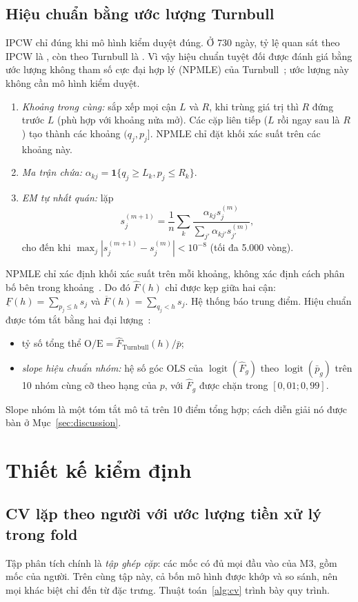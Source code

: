 \documentclass[journal]{IEEEtran}
\begin{document}
\subsection{Hiệu chuẩn bằng ước lượng Turnbull}
IPCW chỉ đúng khi mô hình kiểm duyệt đúng. Ở 730 ngày, tỷ lệ quan sát theo IPCW là , còn theo Turnbull là . Vì vậy hiệu chuẩn tuyệt đối được đánh giá bằng ước lượng không tham số cực đại hợp lý (NPMLE) của Turnbull~\cite{turnbull1976}; ước lượng này không cần mô hình kiểm duyệt.
\begin{enumerate}
\item \emph{Khoảng trong cùng:} sắp xếp mọi cận $L$ và $R$, khi trùng giá trị thì $R$ đứng trước $L$ (phù hợp với khoảng nửa mở). Các cặp liên tiếp ($L$ rồi ngay sau là $R$) tạo thành các khoảng $(q_j,p_j]$. NPMLE chỉ đặt khối xác suất trên các khoảng này.
\item \emph{Ma trận chứa:} $\alpha_{kj}=\bm 1\{q_j\ge L_k, p_j\le R_k\}$.
\item \emph{EM tự nhất quán:} lặp
\begin{equation}\label{eq:turnbull}
s_j^{(m+1)}=\frac1n\sum_k\frac{\alpha_{kj}s_j^{(m)}}{\sum_{j'}\alpha_{kj'}s_{j'}^{(m)}},
\end{equation}
cho đến khi $\max_j|s_j^{(m+1)}-s_j^{(m)}|<10^{-8}$ (tối đa 5.000 vòng).
\end{enumerate}
NPMLE chỉ xác định khối xác suất trên mỗi khoảng, không xác định cách phân bố bên trong khoảng~\cite{sun2006}. Do đó $\hat F(h)$ chỉ được kẹp giữa hai cận: $\underline F(h)=\sum_{p_j\le h}s_j$ và $\overline F(h)=\sum_{q_j<h}s_j$. Hệ thống báo trung điểm. Hiệu chuẩn được tóm tắt bằng hai đại lượng~\cite{vancalster2016}:
\begin{itemize}
\item tỷ số tổng thể $\mathrm{O/E}=\hat F_{\text{Turnbull}}(h)/\bar p$;
\item \emph{slope hiệu chuẩn nhóm:} hệ số góc OLS của $\operatorname{logit}(\hat F_g)$ theo $\operatorname{logit}(\bar p_g)$ trên 10 nhóm cùng cỡ theo hạng của $p$, với $\hat F_g$ được chặn trong $[0{,}01;0{,}99]$.
\end{itemize}
Slope nhóm là một tóm tắt mô tả trên 10 điểm tổng hợp; cách diễn giải nó được bàn ở Mục~\ref{sec:discussion}.

\section{Thiết kế kiểm định}\label{sec:design}
\subsection{CV lặp theo người với ước lượng tiền xử lý trong fold}\label{sec:cv}
Tập phân tích chính là \emph{tập ghép cặp}: các mốc có đủ mọi đầu vào của M3, gồm  mốc của  người. Trên cùng tập này, cả bốn mô hình được khớp và so sánh, nên mọi khác biệt chỉ đến từ đặc trưng. Thuật toán~\ref{alg:cv} trình bày quy trình.
\end{document}
